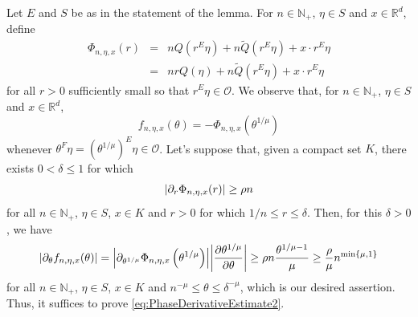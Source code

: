 \documentclass[smallextended]{svjour3}
\theoremstyle{remark}
\renewenvironment{proof}[1][\proofname]{\renewcommand\xproofname{#1}\xproof}{\endxproof}
\newcommand{\p}{\partial}
\newcommand{\f}[2]{\frac{#1}{#2}}
\begin{document}
\begin{proof}
Let $E$ and $S$ be as in the statement of the lemma. For $n\in\mathbb{N}_+$, $\eta\in S$ and $x\in \mathbb{R}^d$, define
\begin{eqnarray*}
\Phi_{n,\eta,x}(r)&=&nQ(r^E\eta)+n\widetilde{Q}(r^E\eta)+x\cdot r^E\eta\\
&=&nrQ(\eta)+n\widetilde{Q}(r^E\eta)+x\cdot r^E\eta
\end{eqnarray*}
for all $r>0$ sufficiently small so that $r^E\eta\in \mathcal{O}$.  We observe that, for $n\in\mathbb{N}_+$, $\eta\in S$ and $x\in\mathbb{R}^d$, 
\begin{equation*}
f_{n,\eta,x}(\theta)=-\Phi_{n,\eta,x}\left(\theta^{1/\mu}\right)
\end{equation*}
whenever $\theta^F\eta=(\theta^{1/\mu})^E\eta\in \mathcal{O}$. Let's suppose that, given a compact set $K$, there exists $0<\delta\leq 1$ for which
\begin{equation}\label{eq:PhaseDerivativeEstimate2}
\abs{\partial_r \Phi_{n,\eta,x}(r)}\geq\rho n
\end{equation}
for all $n\in\mathbb{N}_+$, $\eta\in S$, $x\in K$ and $r>0$ for which $1/n\leq r\leq \delta$. Then, for this $\delta>0$, we have
\begin{equation*}
    \abs{\p_\theta f_{n,\eta,x} (\theta)} = 
     \abs{  \p_{\theta^{1/\mu}} \Phi_{n,\eta,x}\left(\theta^{1/\mu}\right)}
     \abs{ \f{\p \theta^{1/\mu}}{\p \theta}} 
     \geq 
    \rho n\f{\theta^{1/\mu - 1}  }{\mu}  \geq \f{\rho}{\mu}n^{\min\{\mu,1 \}}
\end{equation*}
for all $n\in\mathbb{N}_+$, $\eta\in S$, $x\in K$ and $n^{-\mu}\leq \theta\leq \delta^{-\mu}$, which is our desired assertion. Thus, it suffices to prove \eqref{eq:PhaseDerivativeEstimate2}.



\end{proof}
\end{document}

